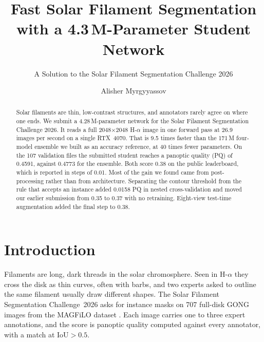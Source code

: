 \documentclass[sigconf]{acmart}
\begin{document}
\title{Fast Solar Filament Segmentation\\with a 4.3\,M-Parameter Student Network}
\subtitle{A Solution to the Solar Filament Segmentation Challenge 2026} %


\author{Alisher Myrgyyassov}

\begin{abstract}
Solar filaments are thin, low-contrast structures, and annotators rarely agree
on where one ends. We submit a 4.28\,M-parameter network for the Solar Filament
Segmentation Challenge 2026. It reads a full 2048$\times$2048 H-$\alpha$ image
in one forward pass at 26.9 images per second on a single RTX~4070. That is 9.5
times faster than the 171\,M four-model ensemble we built as an accuracy
reference, at 40 times fewer parameters. On the 107 validation files the
submitted student reaches a panoptic quality (PQ) of 0.4591, against 0.4773 for
the ensemble. Both score 0.38 on the public leaderboard, which is reported in
steps of 0.01. Most of the gain we found came from post-processing rather than
from architecture. Separating the contour threshold from the rule that accepts
an instance added 0.0158 PQ in nested cross-validation and moved our earlier
submission from 0.35 to 0.37 with no retraining. Eight-view test-time
augmentation added the final step to 0.38.
\end{abstract}


\maketitle

\section{Introduction}
    Filaments are long, dark threads in the solar chromosphere. Seen in H-$\alpha$
    they cross the disk as thin curves, often with barbs, and two experts asked
    to outline the same filament usually draw different shapes. The Solar
    Filament Segmentation Challenge~2026 \cite{filament-segmentation-2026} asks
    for instance masks on 707 full-disk GONG images from the MAGFiLO dataset
    \cite{ahmadzadeh2024dataset}. Each image carries one to three expert
    annotations, and the score is panoptic quality computed against every
    annotator, with a match at IoU$>0.5$.
\end{document}
